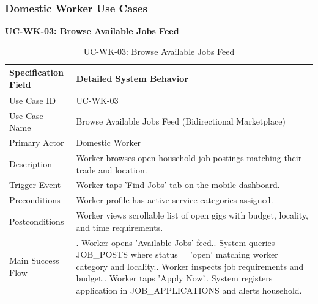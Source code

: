 \documentclass[12pt,a4paper]{article}
\begin{document}
\subsubsection{Domestic Worker Use Cases}
\noindent\textbf{UC-WK-03: Browse Available Jobs Feed}\par
\vspace{4pt}
\begingroup\small\setlength{\tabcolsep}{3pt}\renewcommand{\arraystretch}{1.15}
\begin{longtable}{|>{\raggedright\arraybackslash}p{\dimexpr(\linewidth-4\tabcolsep-3\arrayrulewidth)/2\relax}|>{\raggedright\arraybackslash}p{\dimexpr(\linewidth-4\tabcolsep-3\arrayrulewidth)/2\relax}|}
\caption{UC-WK-03: Browse Available Jobs Feed}\label{tab:uc-wk-03}\\
\hline
Specification Field & Detailed System Behavior \\ \hline
Use Case ID & UC-WK-03 \\ \hline
Use Case Name & Browse Available Jobs Feed (Bidirectional Marketplace) \\ \hline
Primary Actor & Domestic Worker \\ \hline
Description & Worker browses open household job postings matching their trade and location. \\ \hline
Trigger Event & Worker taps 'Find Jobs' tab on the mobile dashboard. \\ \hline
Preconditions & Worker profile has active service categories assigned. \\ \hline
Postconditions & Worker views scrollable list of open gigs with budget, locality, and time requirements. \\ \hline
Main Success Flow & 1. Worker opens 'Available Jobs' feed.\newline 2. System queries JOB\_\allowbreak{}POSTS where status = 'open' matching worker category and locality.\newline 3. Worker inspects job requirements and budget.\newline 4. Worker taps 'Apply Now'.\newline 5. System registers application in JOB\_\allowbreak{}APPLICATIONS and alerts household. \\ \hline
\end{longtable}
\endgroup
\clearpage
\end{document}
